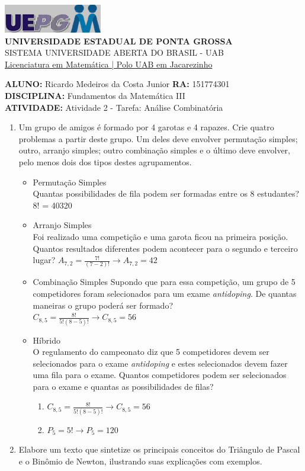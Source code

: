 \documentclass[a4paper, 12pt]{article}
\begin{document}
\begin{flushleft}\includegraphics{logo}\\
\textbf{UNIVERSIDADE ESTADUAL DE PONTA GROSSA} \\
SISTEMA UNIVERSIDADE ABERTA DO BRASIL - UAB \\
\underline{Licenciatura em Matemática | Polo UAB em Jacarezinho}\end{flushleft} 
\textbf{ALUNO:} Ricardo Medeiros da Costa Junior   \textbf{RA:} 151774301 \\
\textbf{DISCIPLINA:} Fundamentos da Matemática III \\
\textbf{ATIVIDADE:} Atividade 2 - Tarefa: Análise Combinatória \\
\begin{enumerate}
\item Um grupo de amigos é formado por 4 garotas e 4 rapazes. Crie quatro problemas a partir deste grupo. Um deles deve envolver permutação simples; outro, arranjo simples; outro combinação simples e o último deve envolver, pelo menos dois dos tipos destes agrupamentos.\\
  \begin{itemize}
  \item Permutação Simples \\
    Quantas possibilidades de fila podem ser formadas entre os 8 estudantes?\\
    8! = 40320
  \item Arranjo Simples \\
    Foi realizado uma competição e uma garota ficou na primeira posição. Quantos resultados diferentes podem acontecer para o segundo e terceiro lugar?
    $A_{7,2}=\frac{7!}{(7-2)!}\rightarrow
     A_{7,2}=42$
   \item Combinação Simples
     Supondo que para essa competição, um grupo de 5 competidores foram selecionados para um exame \emph{antidoping}. De quantas maneiras o grupo poderá ser formado?\\
     $C_{8,5}=\frac{8!}{5!(8-5)!}\rightarrow
      C_{8,5}=56$
    \item Híbrido \\
      O regulamento do campeonato diz que 5 competidores devem ser selecionados para o exame \emph{antidoping} e estes selecionados devem fazer uma fila para o exame. Quantos competidores podem ser selecionados para o exame e quantas as possibilidades de filas?
      \begin{enumerate}
        \item $C_{8,5}=\frac{8!}{5!(8-5)!}\rightarrow
          C_{8,5}=56$
        \item $P_{5}=5!\rightarrow
              P_{5}=120$        
      \end{enumerate}
  \end{itemize}
\item Elabore um texto que sintetize os principais conceitos do Triângulo de Pascal e o Binômio de Newton, ilustrando suas explicações com exemplos.\\
\end{enumerate}
\end{document}
